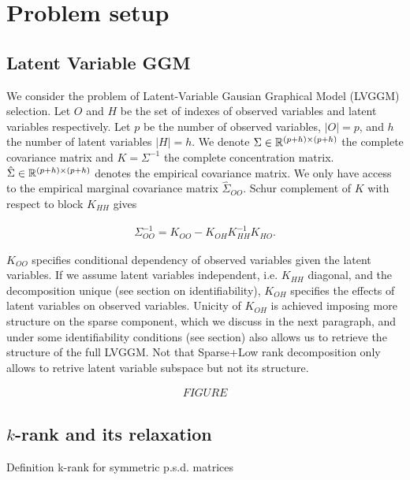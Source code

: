 \section{Problem setup}
\label{setup}

\subsection{Latent Variable GGM}
We consider the problem of Latent-Variable Gausian Graphical Model (LVGGM) selection. Let $O$ and $H$ be the set of indexes of observed variables and latent variables respectively. Let $p$ be the number of observed variables, $|O|=p$, and  $h$ the number of latent variables $|H|=h$. We denote $\Sigma\in\mathbb{R}^{(p+h)\times(p+h)}$ the complete covariance matrix and $K=\Sigma^{-1}$ the complete concentration matrix. $\hat{\Sigma}\in\mathbb{R}^{(p+h)\times(p+h)}$ denotes the empirical covariance matrix. We only have access to the empirical marginal covariance matrix $\hat{\Sigma}_{OO}$. Schur complement of $K$ with respect to block $K_{HH}$ gives 

\begin{align}
\Sigma_{OO}^{-1} = K_{OO}-K_{OH}K_{HH}^{-1}K_{HO}.
\end{align}

$K_{OO}$ specifies conditional dependency of observed variables given the latent variables. If we assume latent variables independent, i.e. $K_{HH}$ diagonal, and the decomposition unique (see section on identifiability), $K_{OH}$ specifies the effects of latent variables on observed variables. Unicity of $K_{OH}$ is achieved imposing more structure on the sparse component, which we discuss in the next paragraph, and under some identifiability conditions (see section) also allows us to retrieve the structure of the full LVGGM. Not that Sparse+Low rank decomposition only allows to retrive latent variable subspace but not its structure.

\begin{align}
FIGURE
\end{align}

\subsection{$k$-rank and its relaxation}
Definition k-rank for symmetric p.s.d. matrices

